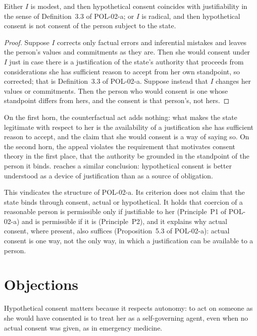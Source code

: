 \documentclass{situationist-preprint}
\begin{document}
\begin{proposition}\label{p:dilemma}
Either $I$ is modest, and then hypothetical consent coincides with justifiability in the sense of Definition~3.3 of POL-02-a; or $I$ is radical, and then hypothetical consent is not consent of the person subject to the state.
\end{proposition}

\begin{proof}
Suppose $I$ corrects only factual errors and inferential mistakes and leaves the person's values and commitments as they are. Then she would consent under $I$ just in case there is a justification of the state's authority that proceeds from considerations she has sufficient reason to accept from her own standpoint, so corrected; that is Definition~3.3 of POL-02-a. Suppose instead that $I$ changes her values or commitments. Then the person who would consent is one whose standpoint differs from hers, and the consent is that person's, not hers.
\end{proof}

On the first horn, the counterfactual act adds nothing: what makes the state legitimate with respect to her is the availability of a justification she has sufficient reason to accept, and the claim that she would consent is a way of saying so. On the second horn, the appeal violates the requirement that motivates consent theory in the first place, that the authority be grounded in the standpoint of the person it binds. \citet{Stark2000} reaches a similar conclusion: hypothetical consent is better understood as a device of justification than as a source of obligation.

This vindicates the structure of POL-02-a. Its criterion does not claim that the state binds through consent, actual or hypothetical. It holds that coercion of a reasonable person is permissible only if justifiable to her (Principle~P1 of POL-02-a) and is permissible if it is (Principle~P2), and it explains why actual consent, where present, also suffices (Proposition~5.3 of POL-02-a): actual consent is one way, not the only way, in which a justification can be available to a person.

\section{Objections}

\begin{objection}
Hypothetical consent matters because it respects autonomy: to act on someone as she would have consented is to treat her as a self-governing agent, even when no actual consent was given, as in emergency medicine.
\end{objection}
\end{document}
